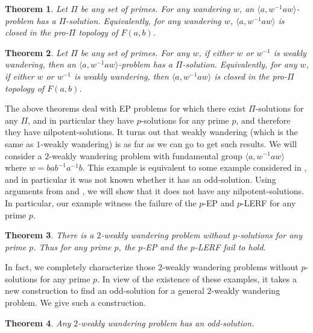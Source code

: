 \documentclass[11pt]{amsart}
\newtheorem{theorem}{Theorem}[section]
\theoremstyle{definition}
\theoremstyle{definition}
\numberwithin{equation}{section}
\begin{document}
\begin{theorem}\label{thm:mainwandering} Let $\Pi$ be any set of primes. For any wandering $w$, an $\langle a, w^{-1}aw\rangle$-problem has a $\Pi$-solution. Equivalently, for any wandering $w$, $\langle a, w^{-1}aw\rangle$ is closed in the pro-$\Pi$ topology of $F(a, b)$.
\end{theorem}

\begin{theorem}\label{thm:mainweaklywandering} Let $\Pi$ be any set of primes. For any $w$, if either $w$ or $w^{-1}$ is weakly wandering, then an $\langle a, w^{-1}aw\rangle$-problem has a $\Pi$-solution. Equivalently, for any $w$,  if either $w$ or $w^{-1}$ is weakly wandering, then $\langle a, w^{-1}aw\rangle$ is closed in the pro-$\Pi$ topology of $F(a, b)$.
\end{theorem}

The above theorems deal with EP problems for which there exist $\Pi$-solutions for any $\Pi$, and in particular they have $p$-solutions for any prime $p$, and therefore they have nilpotent-solutions. It turns out that weakly wandering (which is the same as $1$-weakly wandering) is as far as we can go to get such results. We will consider a $2$-weakly wandering problem with fundamental group $\langle a, w^{-1}aw\rangle$ where $w=bab^{-1}a^{-1}b$. This example is equivalent to some example considered in \cite{HPSW19}, and in particular it was not known whether it has an odd-solution. Using arguments from \cite{MSW01} and \cite{HPSW19}, we will show that it does not have any nilpotent-solutions. In particular, our example witness the failure of the $p$-EP and $p$-LERF for any prime $p$.

\begin{theorem}\label{thm:pEP} There is a $2$-weakly wandering problem without $p$-solutions for any prime $p$. Thus for any prime $p$,  the $p$-{\rm EP} and the $p$-{\rm LERF} fail to hold.
\end{theorem}

In fact, we completely characterize those $2$-weakly wandering problems without $p$-solutions for any prime $p$. In view of the existence of these examples, it takes a new construction to find an odd-solution for a general $2$-weakly wandering problem. We give such a construction.

\begin{theorem}\label{thm:main2weaklywandering} Any $2$-weakly wandering problem has an odd-solution.
\end{theorem}
\end{document}
